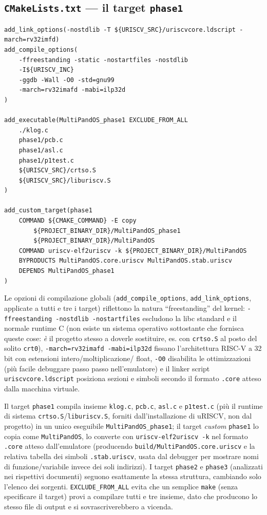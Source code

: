 \documentclass[11pt,a4paper]{article}
\newcommand{\code}[1]{\texttt{#1}}
\begin{document}
\subsection{\code{CMakeLists.txt} --- il target \code{phase1}}
\begin{lstlisting}
add_link_options(-nostdlib -T ${URISCV_SRC}/uriscvcore.ldscript -march=rv32imfd)
add_compile_options(
    -ffreestanding -static -nostartfiles -nostdlib
    -I${URISCV_INC}
    -ggdb -Wall -O0 -std=gnu99
    -march=rv32imafd -mabi=ilp32d
)

add_executable(MultiPandOS_phase1 EXCLUDE_FROM_ALL
    ./klog.c
    phase1/pcb.c
    phase1/asl.c
    phase1/p1test.c
    ${URISCV_SRC}/crtso.S
    ${URISCV_SRC}/liburiscv.S
)

add_custom_target(phase1
    COMMAND ${CMAKE_COMMAND} -E copy
        ${PROJECT_BINARY_DIR}/MultiPandOS_phase1
        ${PROJECT_BINARY_DIR}/MultiPandOS
    COMMAND uriscv-elf2uriscv -k ${PROJECT_BINARY_DIR}/MultiPandOS
    BYPRODUCTS MultiPandOS.core.uriscv MultiPandOS.stab.uriscv
    DEPENDS MultiPandOS_phase1
)
\end{lstlisting}
Le opzioni di compilazione globali (\code{add\_compile\_options},
\code{add\_link\_options}, applicate a tutti e tre i target) riflettono la
natura ``freestanding'' del kernel: \code{-ffreestanding -nostdlib
-nostartfiles} escludono la libc standard e il normale runtime C (non
esiste un sistema operativo sottostante che fornisca queste cose: \emph{è}
il progetto stesso a doverle sostituire, es. con \code{crtso.S} al posto
del solito \code{crt0}), \code{-march=rv32imafd -mabi=ilp32d} fissano
l'architettura RISC-V a 32 bit con estensioni intero/moltiplicazione/
float, \code{-O0} disabilita le ottimizzazioni (più facile debuggare passo
passo nell'emulatore) e il linker script \code{uriscvcore.ldscript}
posiziona sezioni e simboli secondo il formato \code{.core} atteso dalla
macchina virtuale.

Il target \code{phase1} compila insieme \code{klog.c}, \code{pcb.c},
\code{asl.c} e \code{p1test.c} (più il runtime di sistema
\code{crtso.S}/\code{liburiscv.S}, forniti dall'installazione di uRISCV,
non dal progetto) in un unico eseguibile \code{MultiPandOS\_phase1}; il
target \emph{custom} \code{phase1} lo copia come \code{MultiPandOS}, lo
converte con \code{uriscv-elf2uriscv -k} nel formato \code{.core} atteso
dall'emulatore (producendo \code{build/MultiPandOS.core.uriscv} e la
relativa tabella dei simboli \code{.stab.uriscv}, usata dal debugger per
mostrare nomi di funzione/variabile invece dei soli indirizzi). I target
\code{phase2} e \code{phase3} (analizzati nei rispettivi documenti) seguono
esattamente la stessa struttura, cambiando solo l'elenco dei sorgenti.
\code{EXCLUDE\_FROM\_ALL} evita che un semplice \code{make} (senza
specificare il target) provi a compilare tutti e tre insieme, dato che
producono lo stesso file di output e si sovrascriverebbero a vicenda.
\end{document}
